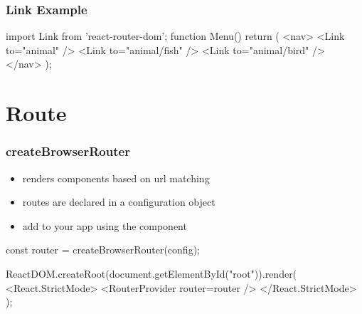 \begin{frame}[fragile] \frametitle{Link Example}
\begin{CodeBox}{}
import { Link } from 'react-router-dom';
function Menu() {
  return (
    <nav>
      <Link to="animal" />
      <Link to="animal/fish" />
      <Link to="animal/bird" />
    </nav>
  );
}
\end{CodeBox}
\end{frame}

\section{Route}
\begin{frame}[fragile] \frametitle{createBrowserRouter}
\begin{itemize}
  \item renders components based on url matching
  \item routes are declared in a configuration object
  \item add to your app using the  component
\end{itemize}
\vspace{5mm}
\begin{CodeBox}{}
const router = createBrowserRouter(config);

ReactDOM.createRoot(document.getElementById("root")).render(
  <React.StrictMode>
    <RouterProvider router={router} />
  </React.StrictMode>
);
\end{CodeBox}
\end{frame}

